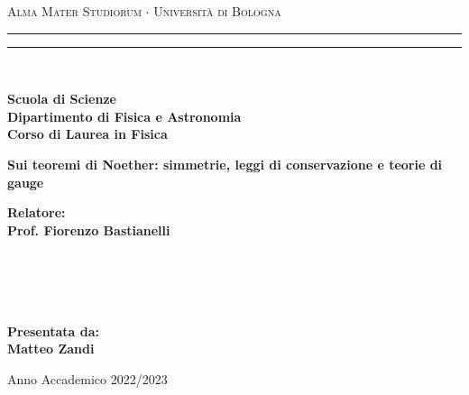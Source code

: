 \textwidth=450pt\oddsidemargin=0pt

\begin{titlepage}

\begin{center}
{{\Large{\textsc{Alma Mater Studiorum $\cdot$ Universit\`a di Bologna}}}} 
\rule[0.1cm]{15.8cm}{0.1mm}
\rule[0.5cm]{15.8cm}{0.6mm}
\\\vspace{3mm}

{\small{\bf Scuola di Scienze \\ 
Dipartimento di Fisica e Astronomia\\
Corso di Laurea in Fisica}}

\end{center}

\vspace{23mm}

\begin{center}
{\LARGE{\bf Sui teoremi di Noether: simmetrie, leggi di conservazione e teorie di gauge}}\\
\end{center}

\vspace{50mm} \par \noindent

\begin{minipage}[t]{0.47\textwidth}
{\large{\bf Relatore:\vspace{2mm}\\
Prof. Fiorenzo Bastianelli}\\\\
\bf
\vspace{2mm}\\
\\\\}
\end{minipage}
\hfill
\begin{minipage}[t]{0.47\textwidth}\raggedleft 
{\large{\bf Presentata da:
\vspace{2mm}\\
Matteo Zandi}}
\end{minipage}

\vspace{40mm}

\begin{center}

Anno Accademico 2022/2023
\end{center}

\end{titlepage}
